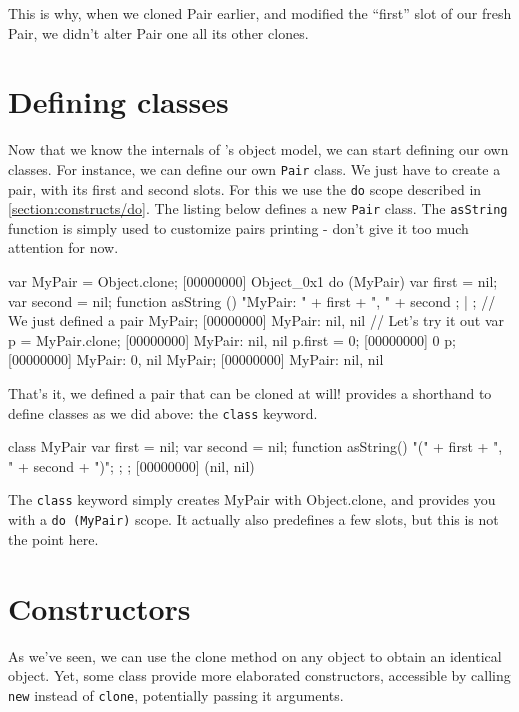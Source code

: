 This is why, when we cloned Pair earlier, and modified the ``first''
slot of our fresh Pair, we didn't alter Pair one all its other clones.

\section{Defining classes}

Now that we know the internals of \us's object model, we can start
defining our own classes. For instance, we can define our own
\lstinline{Pair} class. We just have to create a pair, with its first and
second slots. For this we use the \lstinline{do} scope described in
\autoref{section:constructs/do}. The listing below defines a new
\lstinline{Pair} class. The \lstinline{asString} function is simply used to
customize pairs printing - don't give it too much attention for now.

\begin{urbiscript}
var MyPair = Object.clone;
[00000000] Object_0x1
do (MyPair)
{
  var first = nil;
  var second = nil;
  function asString ()
  {
    "MyPair: " + first + ", " + second
  };
} | {};
// We just defined a pair
MyPair;
[00000000] MyPair: nil, nil
// Let's try it out
var p = MyPair.clone;
[00000000] MyPair: nil, nil
p.first = 0;
[00000000] 0
p;
[00000000] MyPair: 0, nil
MyPair;
[00000000] MyPair: nil, nil
\end{urbiscript}

That's it, we defined a pair that can be cloned at will! \us
provides a shorthand to define classes as we did above: the
\lstinline{class} keyword.

\begin{urbiscript}
class MyPair
{
  var first = nil;
  var second = nil;
  function asString() { "(" + first + ", " + second + ")"; };
};
[00000000] (nil, nil)
\end{urbiscript}

The \lstinline{class} keyword simply creates MyPair with Object.clone,
and provides you with a \lstinline|do (MyPair)| scope. It actually also
predefines a few slots, but this is not the point here.

\section{Constructors}
\label{sec:tut:ctor}
As we've seen, we can use the clone method on any object to obtain an
identical object. Yet, some class provide more elaborated
constructors, accessible by calling \lstinline{new} instead of
\lstinline{clone}, potentially passing it arguments.

